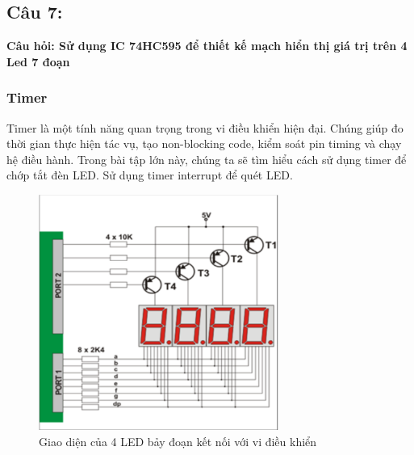 \pagebreak

\subsection{Câu 7:}
\textbf{Câu hỏi: Sử dụng IC 74HC595 để thiết kế mạch hiển thị giá trị trên 4 Led 7 đoạn}
\subsubsection{Timer}
Timer là một tính năng quan trọng trong vi điều khiển hiện đại. Chúng giúp đo thời gian thực hiện tác vụ, tạo non-blocking code, kiểm soát pin timing và chạy hệ điều hành. Trong bài tập lớn này, chúng ta sẽ tìm hiểu cách sử dụng timer để chớp tắt đèn LED. Sử dụng timer interrupt để quét LED.
\begin{figure}[ht]
    \centering
    \includegraphics[width=0.7\textwidth]{graphics/LED_7seg.PNG}
    \caption{Giao diện của 4 LED bảy đoạn kết nối với vi điều khiển}
\end{figure}


